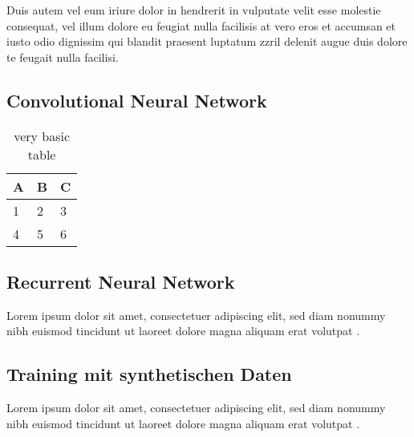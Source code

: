 Duis autem vel eum iriure dolor in hendrerit in vulputate velit esse molestie consequat, vel illum dolore eu feugiat nulla facilisis at vero eros et accumsan et iusto odio dignissim qui blandit praesent luptatum zzril delenit augue duis dolore te feugait nulla facilisi. 


\subsection{Convolutional Neural Network}
\label{grundlagen_nn_cnn}


\begin{table}[h]
\centering
\begin{tabular}{l | l | l}
A & B & C \\
\hline
1 & 2 & 3 \\
4 & 5 & 6
\end{tabular}
\caption{very basic table}
\label{tab:abc}
\end{table}


\subsection{Recurrent Neural Network}
\label{grundlagen_nn_rnn}

Lorem ipsum dolor sit amet, consectetuer adipiscing elit, sed diam nonummy nibh euismod tincidunt ut laoreet dolore magna aliquam erat volutpat \cite{latexcompanion}. 


\subsection{Training mit synthetischen Daten}
\label{grundlagen_nn_synthetisch}

Lorem ipsum dolor sit amet, consectetuer adipiscing elit, sed diam nonummy nibh euismod tincidunt ut laoreet dolore magna aliquam erat volutpat \cite{latexcompanion}. 


